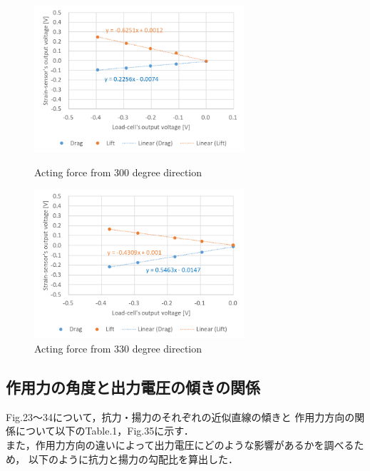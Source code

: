 \documentclass[twocolumn,a4j]{jsarticle}
\begin{document}
\begin{figure}[htbp]
    \footnotesize
    \begin{center}
        \includegraphics[width=78mm]{../../2111/images/300.png}
        \caption{Acting force from 300 degree direction}
        \includegraphics[width=78mm]{../../2111/images/330.png}
        \caption{Acting force from 330 degree direction}
    \end{center}
\end{figure}

\newpage

\subsection{作用力の角度と出力電圧の傾きの関係}

Fig.23～34について，抗力・揚力のそれぞれの近似直線の傾きと
作用力方向の関係について以下のTable.1，Fig.35に示す．\\
また，作用力方向の違いによって出力電圧にどのような影響があるかを調べるため，
以下のように抗力と揚力の勾配比を算出した．\\

\end{document}
